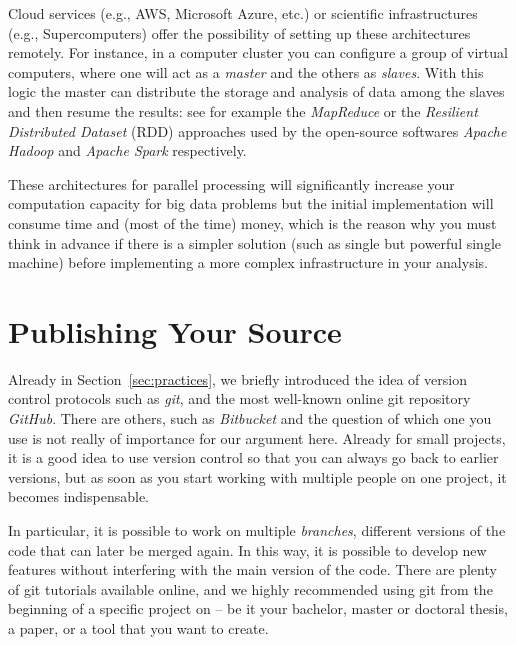 Cloud services (e.g., AWS, Microsoft Azure, etc.) or scientific infrastructures (e.g., Supercomputers) offer the possibility of setting up these architectures remotely. For instance, in a computer cluster you can configure a group of virtual computers, where one will act as a \textit{master} and the others as \textit{slaves}. With this logic the master can distribute the storage and analysis of data among the slaves and then resume the results: see for example the \textit{MapReduce} or the \textit{Resilient Distributed Dataset} (RDD) approaches used by the open-source softwares \textit{Apache Hadoop} and \textit{Apache Spark} respectively.

These architectures for parallel processing will significantly increase your computation capacity for big data problems but the initial implementation will consume time and (most of the time) money, which is the reason why you must think in advance if there is a simpler solution (such as single but powerful single machine) before implementing a more complex infrastructure in your analysis.

%

\section{Publishing Your Source}
\label{sec:publishingsource}

Already in Section~\ref{sec:practices}, we briefly introduced the idea of
version control protocols such as \emph{git}, and the most well-known
online git repository \emph{GitHub}.
There are others, such as \emph{Bitbucket}
and the question of which one you use is not really of importance for our
argument here. Already for small projects, it is a good idea to use
version control so that you can always go back to earlier versions,
but as soon as you start working with multiple people on one project,
it becomes indispensable.

In particular, it is possible to work on multiple \emph{branches},
different versions of the code that can later be merged again. In this
way, it is possible to develop new features without interfering with
the main version of the code. There are plenty of git tutorials
available online, and we highly recommended using git from the
beginning of a specific project on -- be it your bachelor, master or doctoral thesis, a paper, or a tool that you want to create.

